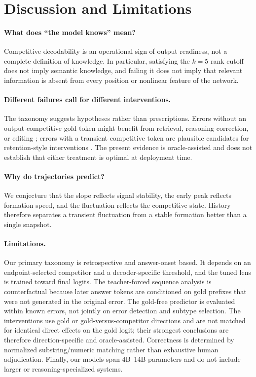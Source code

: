 \documentclass{article} %
\begin{document}
\section{Discussion and Limitations}

\paragraph{What does ``the model knows'' mean?}
Competitive decodability is an operational sign of output readiness, not a complete definition of knowledge. In particular, satisfying the $k=5$ rank cutoff does not imply semantic knowledge, and failing it does not imply that relevant information is absent from every position or nonlinear feature of the network.

\paragraph{Different failures call for different interventions.}
The taxonomy suggests hypotheses rather than prescriptions. Errors without an output-competitive gold token might benefit from retrieval, reasoning correction, or editing \citep{meng2022rome}; errors with a transient competitive token are plausible candidates for retention-style interventions \citep{turner2023activation, zou2023representation}. The present evidence is oracle-assisted and does not establish that either treatment is optimal at deployment time.

\paragraph{Why do trajectories predict?}
We conjecture that the slope reflects signal stability, the early peak reflects formation speed, and the fluctuation reflects the competitive state. History therefore separates a transient fluctuation from a stable formation better than a single snapshot.

\paragraph{Limitations.}
Our primary taxonomy is retrospective and answer-onset based. It depends on an endpoint-selected competitor and a decoder-specific threshold, and the tuned lens is trained toward final logits. The teacher-forced sequence analysis is counterfactual because later answer tokens are conditioned on gold prefixes that were not generated in the original error. The gold-free predictor is evaluated within known errors, not jointly on error detection and subtype selection. The interventions use gold or gold-versus-competitor directions and are not matched for identical direct effects on the gold logit; their strongest conclusions are therefore direction-specific and oracle-assisted. Correctness is determined by normalized substring/numeric matching rather than exhaustive human adjudication. Finally, our models span 4B--14B parameters and do not include larger or reasoning-specialized systems.
\end{document}
